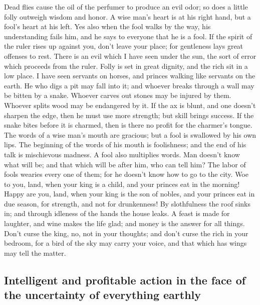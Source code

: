  Dead flies cause the oil of the perfumer to produce an
evil odor; so does a little folly outweigh wisdom and honor.
 A wise man's heart is at his right hand, but a fool's
heart at his left.  Yes also when the fool walks by the
way, his understanding fails him, and he says to everyone that he is a
fool.  If the spirit of the ruler rises up against you,
don't leave your place; for gentleness lays great offenses to rest.
 There is an evil which I have seen under the sun, the
sort of error which proceeds from the ruler.  Folly is set
in great dignity, and the rich sit in a low place.  I have
seen servants on horses, and princes walking like servants on the earth.
 He who digs a pit may fall into it; and whoever breaks
through a wall may be bitten by a snake.  Whoever carves
out stones may be injured by them. Whoever splits wood may be endangered
by it.  If the ax is blunt, and one doesn't sharpen the
edge, then he must use more strength; but skill brings success.
 If the snake bites before it is charmed, then is there
no profit for the charmer's tongue.  The words of a wise
man's mouth are gracious; but a fool is swallowed by his own lips.
 The beginning of the words of his mouth is foolishness;
and the end of his talk is mischievous madness.  A fool
also multiplies words. Man doesn't know what will be; and that which
will be after him, who can tell him?  The labor of fools
wearies every one of them; for he doesn't know how to go to the city.
 Woe to you, land, when your king is a child, and your
princes eat in the morning!  Happy are you, land, when
your king is the son of nobles, and your princes eat in due season, for
strength, and not for drunkenness!  By slothfulness the
roof sinks in; and through idleness of the hands the house leaks.
 A feast is made for laughter, and wine makes the life
glad; and money is the answer for all things.  Don't
curse the king, no, not in your thoughts; and don't curse the rich in
your bedroom, for a bird of the sky may carry your voice, and that which
has wings may tell the matter.

\hypertarget{intelligent-and-profitable-action-in-the-face-of-the-uncertainty-of-everything-earthly}{%
\subsection{Intelligent and profitable action in the face of the
uncertainty of everything
earthly}\label{intelligent-and-profitable-action-in-the-face-of-the-uncertainty-of-everything-earthly}}

